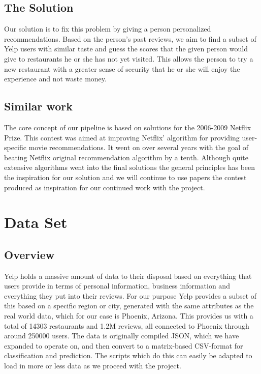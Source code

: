 \documentclass[10pt,twocolumn,letterpaper]{article}
\begin{document}
\subsection{The Solution}
Our solution is to fix this problem by giving a person personalized recommendations. Based on the person's past reviews, we aim to find a subset of Yelp users with similar taste and guess the scores that the given person would give to restaurants he or she has not yet visited. This allows the person to try a new restaurant with a greater sense of security that he or she will enjoy the experience and not waste money.
\subsection{Similar work}
The core concept of our pipeline is based on solutions for the 2006-2009 Netflix Prize. This contest was aimed at improving Netflix' algorithm for providing user-specific movie recommendations. It went on over several years with the goal of beating Netflix original recommendation algorithm by a tenth. Although quite extensive algorithms went into the final solutions the general principles has been the inspiration for our solution and we will continue to use papers the contest produced as inspiration for our continued work with the project\cite{KorBell}\cite{BellKor}.

\section{Data Set}
\subsection{Overview}
Yelp holds a massive amount of data to their disposal based on everything that users provide in terms of personal information, business information and everything they put into their reviews. For our purpose Yelp provides a subset of this based on a specific region or city, generated with the same attributes as the real world data, which for our case is Phoenix, Arizona. This provides us with a total of 14303 restaurants and 1.2M reviews, all connected to Phoenix through around 250000 users. The data is originally compiled JSON, which we have expanded to operate on, and then convert to a matrix-based CSV-format for classification and prediction. The scripts which do this can easily be adapted to load in more or less data as we proceed with the project.
\end{document}
